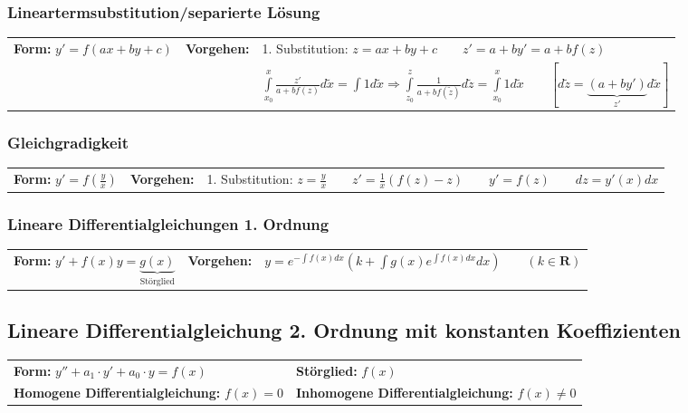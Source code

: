 \subsubsection{Lineartermsubstitution/separierte Lösung}
\begin{tabular}{p{4cm}p{1.5cm}p{10.5cm}}
\textbf{Form:} $y'=f(ax+by+c)$   &
\textbf{Vorgehen:}               &
1. Substitution: $z=ax+by+c \qquad z'=a+by' =a+bf(z)$\\ &&

$\int\limits_{x_0}^{x}\frac{z'}{a+bf(z)}d\tilde{x} = \int 1 d\tilde{x} \Rightarrow \int\limits_{z_0}^{z}\frac{1}{a+bf(\tilde{z})}d\tilde{z} = \int\limits_{x_0}^{x}1 d\tilde{x} \qquad [d\tilde{z} = \underbrace{(a+by')}_{z'} d\tilde{x}]$
\end{tabular}

\subsubsection{Gleichgradigkeit}
\begin{tabular}{p{4cm}p{1.5cm}p{15cm}}
\textbf{Form:} $y'=f(\frac{y}{x})$ &
\textbf{Vorgehen:}                &
1. Substitution: $z=\frac{y}{x} \qquad
z'=\frac{1}{x}(f(z)-z) \qquad
y'=f(z) \qquad
dz=y'(x)dx$ 
\end{tabular}

\subsubsection{Lineare Differentialgleichungen 1. Ordnung }
\begin{tabular}{p{4.5cm}p{1.5cm}p{10.5cm}}
\textbf{Form:} $ y'+f(x)y = \underbrace{g(x)}_{\text{Störglied}} $ &
\textbf{Vorgehen:}                 &
$ y=e^{-\int f(x) dx}(k+\int g(x)e^{\int f(x)dx}dx) \qquad (k\in\mathbf{R})$
\end{tabular}


\subsection{Lineare Differentialgleichung 2. Ordnung mit konstanten Koeffizienten }
\begin{tabular}{p{8cm}p{8cm}}
\textbf{Form:} $y''+a_1\cdot y'+a_0\cdot y=f(x)$  &
\textbf{Störglied:} $f(x)$\\
\textbf{Homogene Differentialgleichung:} $f(x)=0$ &
\textbf{Inhomogene Differentialgleichung:} $f(x)\neq 0$
\end{tabular}

